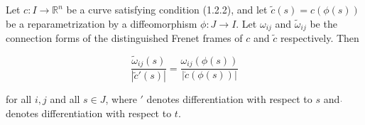 Let $c: I \to \mathbb{R}^n$ be a curve satisfying condition (1.2.2), and let $\tilde{c}(s) = c(\phi(s))$ be a reparametrization by a diffeomorphism $\phi: J \to I$. Let $\omega_{ij}$ and $\tilde{\omega}_{ij}$ be the connection forms of the distinguished Frenet frames of $c$ and $\tilde{c}$ respectively. Then

$$\frac{\tilde{\omega}_{ij}(s)}{|\tilde{c}'(s)|} = \frac{\omega_{ij}(\phi(s))}{|\dot{c}(\phi(s))|}$$

for all $i, j$ and all $s \in J$, where $'$ denotes differentiation with respect to $s$ and $\dot{}$ denotes differentiation with respect to $t$.
